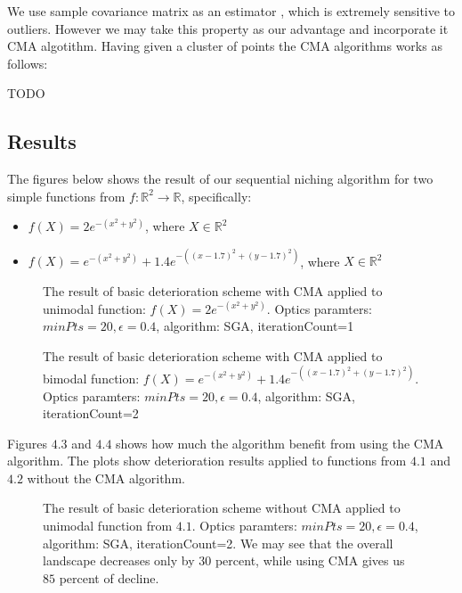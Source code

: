 We use sample covariance matrix as an estimator \cite{covariance}, which is 
extremely sensitive to outliers. However we may take this property as our
advantage and incorporate it CMA algotithm. 
Having given a cluster of points the CMA algorithms works as follows:

TODO

\subsection{Results}

The figures below shows the result of our sequential niching algorithm for two
simple functions from $f:\mathbb{R}^2 \rightarrow \mathbb{R}$, specifically:
\begin{itemize}
  \item $f(X) = 2e^{-(x^2 + y^2)}$, where $X \in \mathbb{R}^2$
  \item $f(X) = e^{-(x^2 + y^2)}+1.4e^{-((x-1.7)^2 + (y-1.7)^2)}$, where $X \in
  \mathbb{R}^2$
\end{itemize}

\begin{figure}
  \centering
  \caption{The result of basic deterioration scheme with CMA 
  applied to unimodal function: $f(X) = 2e^{-(x^2 +y^2)}$.
  Optics paramters: $minPts=20, \epsilon=0.4$, algorithm: SGA, iterationCount=1}
  \label{det1}
\end{figure}

\begin{figure}
  \centering
  \caption{The result of basic deterioration scheme with CMA 
  applied to bimodal function: $f(X) = e^{-(x^2 + y^2)}+1.4e^{-((x-1.7)^2 +
  (y-1.7)^2)}$. Optics paramters: $minPts=20, \epsilon=0.4$, algorithm: SGA, iterationCount=2}
  \label{det2}
\end{figure}

Figures $4.3$ and $4.4$ shows how much the algorithm benefit from using
the CMA algorithm. The plots show deterioration results applied to
functions from $4.1$ and $4.2$ without the CMA algorithm.

\begin{figure}
  \centering
  \caption{The result of basic deterioration scheme without CMA 
  applied to unimodal function from $4.1$. Optics paramters: $minPts=20,
  \epsilon=0.4$, algorithm: SGA, iterationCount=2. We may see that the 
  overall landscape decreases only by $30$ percent, while using CMA
  gives us $85$ percent of decline.}
  \label{det3}
\end{figure}

